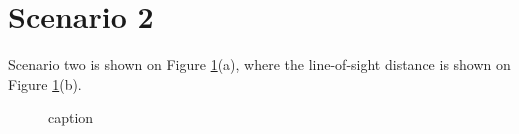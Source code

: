 \section{Scenario 2}\label{sec:scenario2}
Scenario two is shown on Figure \ref{fig:topigraphic}(a), where the line-of-sight distance is shown on Figure \ref{fig:topigraphic}(b).  
% 

\begin{figure}[H]
\hfill
{}
\hfill
{}
\hfill
\caption{caption}
\label{fig:topigraphic}
\end{figure}

